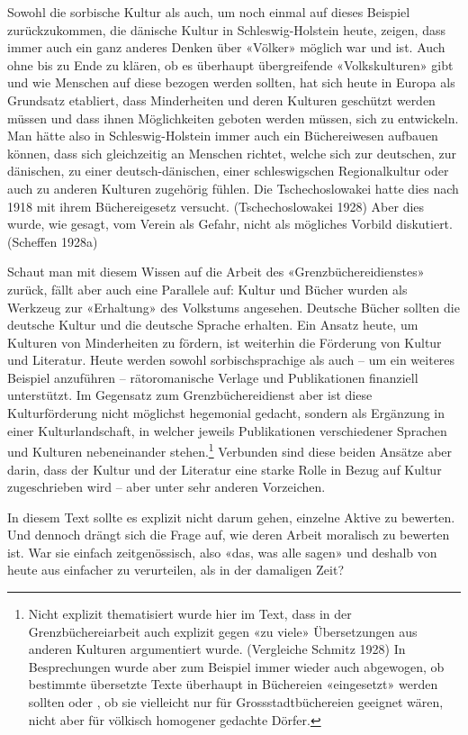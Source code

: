 \documentclass[a4paper,
fontsize=11pt,
oneside,
numbers=noperiodatend,
parskip=half-,
bibliography=totoc,
final
]{scrartcl}
\begin{document}
Sowohl die sorbische Kultur als auch, um noch einmal auf dieses Beispiel
zurückzukommen, die dänische Kultur in Schleswig-Holstein heute, zeigen,
dass immer auch ein ganz anderes Denken über «Völker» möglich war und
ist. Auch ohne bis zu Ende zu klären, ob es überhaupt übergreifende
«Volkskulturen» gibt und wie Menschen auf diese bezogen werden sollten,
hat sich heute in Europa als Grundsatz etabliert, dass Minderheiten und
deren Kulturen geschützt werden müssen und dass ihnen Möglichkeiten
geboten werden müssen, sich zu entwickeln. Man hätte also in
Schleswig-Holstein immer auch ein Büchereiwesen aufbauen können, dass
sich gleichzeitig an Menschen richtet, welche sich zur deutschen, zur
dänischen, zu einer deutsch-dänischen, einer schleswigschen
Regionalkultur oder auch zu anderen Kulturen zugehörig fühlen. Die
Tschechoslowakei hatte dies nach 1918 mit ihrem Büchereigesetz versucht.
(Tschechoslowakei 1928) Aber dies wurde, wie gesagt, vom Verein als
Gefahr, nicht als mögliches Vorbild diskutiert. (Scheffen 1928a)

Schaut man mit diesem Wissen auf die Arbeit des «Grenzbüchereidienstes»
zurück, fällt aber auch eine Parallele auf: Kultur und Bücher wurden als
Werkzeug zur «Erhaltung» des Volkstums angesehen. Deutsche Bücher
sollten die deutsche Kultur und die deutsche Sprache erhalten. Ein
Ansatz heute, um Kulturen von Minderheiten zu fördern, ist weiterhin die
Förderung von Kultur und Literatur. Heute werden sowohl
sorbischsprachige als auch -- um ein weiteres Beispiel anzuführen --
rätoromanische Verlage und Publikationen finanziell unterstützt. Im
Gegensatz zum Grenzbüchereidienst aber ist diese Kulturförderung nicht
möglichst hegemonial gedacht, sondern als Ergänzung in einer
Kulturlandschaft, in welcher jeweils Publikationen verschiedener
Sprachen und Kulturen nebeneinander stehen.\footnote{Nicht explizit
  thematisiert wurde hier im Text, dass in der Grenzbüchereiarbeit auch
  explizit gegen «zu viele» Übersetzungen aus anderen Kulturen
  argumentiert wurde. (Vergleiche Schmitz 1928) In Besprechungen wurde
  aber zum Beispiel immer wieder auch abgewogen, ob bestimmte übersetzte
  Texte überhaupt in Büchereien «eingesetzt» werden sollten oder , ob
  sie vielleicht nur für Grossstadtbüchereien geeignet wären, nicht aber
  für völkisch homogener gedachte Dörfer.} Verbunden sind diese beiden
Ansätze aber darin, dass der Kultur und der Literatur eine starke Rolle
in Bezug auf Kultur zugeschrieben wird -- aber unter sehr anderen
Vorzeichen.

In diesem Text sollte es explizit nicht darum gehen, einzelne Aktive zu
bewerten. Und dennoch drängt sich die Frage auf, wie deren Arbeit
moralisch zu bewerten ist. War sie einfach zeitgenössisch, also «das,
was alle sagen» und deshalb von heute aus einfacher zu verurteilen, als
in der damaligen Zeit?
\end{document}
